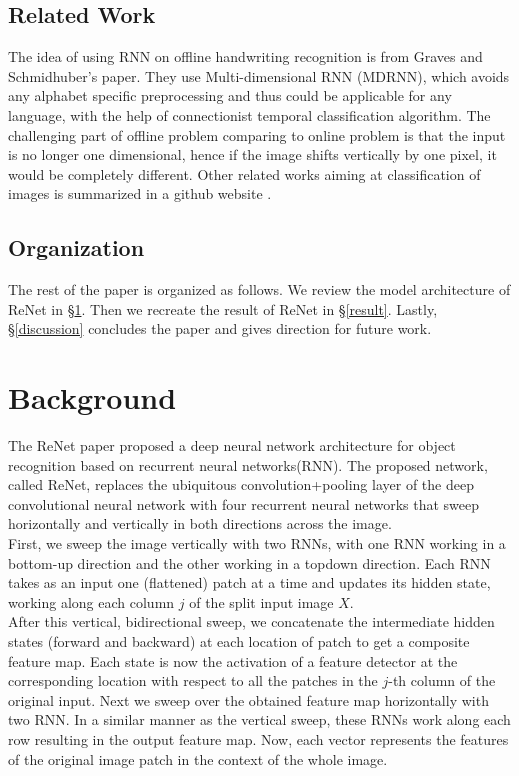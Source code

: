 \documentclass[final,leqno]{siamltex}
\begin{document}
\subsection{Related Work}
The idea of using RNN on offline handwriting recognition is from Graves and Schmidhuber's paper\cite{multidimrnn}. They use Multi-dimensional RNN (MDRNN), which avoids any alphabet specific preprocessing and thus could be applicable for any language, with the help of connectionist temporal classification algorithm. The challenging part of offline problem comparing to online problem is that the input is no longer one dimensional, hence if the image shifts vertically by one pixel, it would be completely different. 
Other related works aiming at classification of images is summarized in a github website \cite{imgcls}. 

\subsection{Organization}

The rest of the paper is organized as follows. We review the model architecture of ReNet in \S \ref{background}. Then we recreate the result of ReNet in \S \ref{result}. Lastly, \S \ref{discussion} concludes the paper and gives direction for future work.

\section{Background} \label{background} 
The ReNet paper proposed a deep neural network architecture for object recognition based on recurrent neural networks(RNN). The proposed network, called ReNet, replaces the ubiquitous convolution+pooling layer of the deep convolutional neural network with four recurrent neural networks that sweep horizontally and vertically in both directions across the image. \\

First, we sweep the image vertically with two RNNs, with one RNN working in a bottom-up direction and the other working in a topdown direction. Each RNN takes as an input one (flattened) patch at a time and updates its hidden state, working along each column $j$ of the split input image $X$.\\

After this vertical, bidirectional sweep, we concatenate the intermediate hidden states (forward and backward) at each location of patch to get a composite feature map. Each state is now the activation of a feature detector at the corresponding location with respect to all the patches in the $j$-th column of the original input. Next we sweep over the obtained feature map horizontally with two RNN. In a similar manner as the vertical sweep, these RNNs work along each row resulting in the output feature map. Now, each vector represents the features of the original image patch in the context of the whole image.\\
\end{document}
